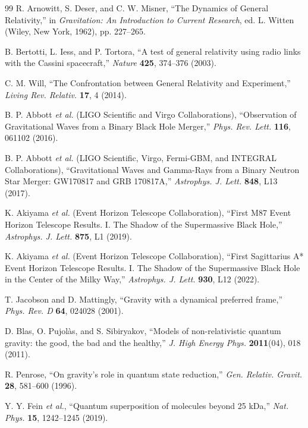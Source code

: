 \documentclass[11pt,a4paper]{article}
\theoremstyle{definition}
\theoremstyle{remark}
\begin{document}
\begin{thebibliography}{99}
 R. Arnowitt, S. Deser, and C. W. Misner, ``The Dynamics of General Relativity,'' in \textit{Gravitation: An Introduction to Current Research}, ed. L. Witten (Wiley, New York, 1962), pp. 227--265.

 B. Bertotti, L. Iess, and P. Tortora, ``A test of general relativity using radio links with the Cassini spacecraft,'' \textit{Nature} \textbf{425}, 374--376 (2003).

 C. M. Will, ``The Confrontation between General Relativity and Experiment,'' \textit{Living Rev. Relativ.} \textbf{17}, 4 (2014).

 B. P. Abbott \textit{et al.} (LIGO Scientific and Virgo Collaborations), ``Observation of Gravitational Waves from a Binary Black Hole Merger,'' \textit{Phys. Rev. Lett.} \textbf{116}, 061102 (2016).

 B. P. Abbott \textit{et al.} (LIGO Scientific, Virgo, Fermi-GBM, and INTEGRAL Collaborations), ``Gravitational Waves and Gamma-Rays from a Binary Neutron Star Merger: GW170817 and GRB 170817A,'' \textit{Astrophys. J. Lett.} \textbf{848}, L13 (2017).

 K. Akiyama \textit{et al.} (Event Horizon Telescope Collaboration), ``First M87 Event Horizon Telescope Results. I. The Shadow of the Supermassive Black Hole,'' \textit{Astrophys. J. Lett.} \textbf{875}, L1 (2019).

 K. Akiyama \textit{et al.} (Event Horizon Telescope Collaboration), ``First Sagittarius A* Event Horizon Telescope Results. I. The Shadow of the Supermassive Black Hole in the Center of the Milky Way,'' \textit{Astrophys. J. Lett.} \textbf{930}, L12 (2022).

 T. Jacobson and D. Mattingly, ``Gravity with a dynamical preferred frame,'' \textit{Phys. Rev. D} \textbf{64}, 024028 (2001).

 D. Blas, O. Pujol\`as, and S. Sibiryakov, ``Models of non-relativistic quantum gravity: the good, the bad and the healthy,'' \textit{J. High Energy Phys.} \textbf{2011}(04), 018 (2011).

 R. Penrose, ``On gravity's role in quantum state reduction,'' \textit{Gen. Relativ. Gravit.} \textbf{28}, 581--600 (1996).

 Y. Y. Fein \textit{et al.}, ``Quantum superposition of molecules beyond 25 kDa,'' \textit{Nat. Phys.} \textbf{15}, 1242--1245 (2019).


\end{thebibliography}
\end{document}
